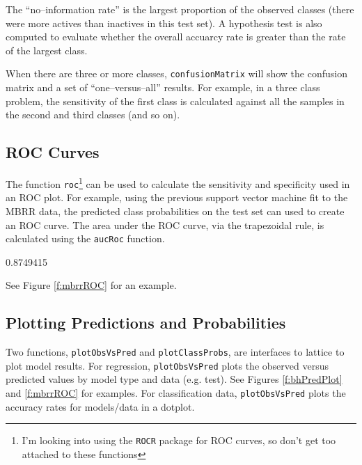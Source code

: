 \documentclass[12pt]{article}
\begin{document}
The ``no--information rate'' is the largest proportion of the observed classes (there were more actives than inactives in this test set). A hypothesis test is also computed to evaluate whether the overall accuarcy rate is greater than the rate of the largest class. 

When there are three or more classes, \texttt{confusionMatrix} will show the confusion matrix and a set of ``one--versus--all'' results. For example, in a three class problem, the sensitivity of the first class is calculated against all the samples in the second and third classes (and so on).


\subsection*{ROC Curves}

The function \texttt{roc}\footnote{I'm looking into using the \texttt{ROCR} package for ROC curves, so don't get too attached to these functions} can be used to calculate the sensitivity and specificity used in an ROC plot. For example, using the previous support vector machine fit to the MBRR data, the predicted class probabilities on the test set can used to create an ROC curve. The area under the ROC curve, via the trapezoidal rule, is calculated using the \texttt{aucRoc} function. 

\begin{small}
\begin{Schunk}
\begin{Soutput}
[1] 0.8749415
\end{Soutput}
\end{Schunk}
\end{small}

See Figure \ref{f:mbrrROC} for an example.

\subsection*{Plotting Predictions and Probabilities}

Two functions, \texttt{plotObsVsPred} and \texttt{plotClassProbs}, are interfaces to lattice to plot model results. For regression, \texttt{plotObsVsPred} plots the observed versus predicted values by model type and data (e.g. test). See Figures \ref{f:bhPredPlot} and \ref{f:mbrrROC}  for examples. For classification data, \texttt{plotObsVsPred} plots the accuracy rates for models/data in a dotplot. 
\end{document}
